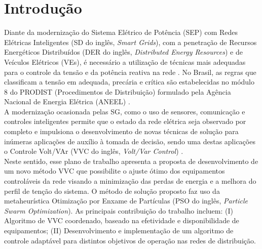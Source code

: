 \documentclass[]{IEEEphot}
\begin{document}
\section{Introdução}
Diante da modernização do Sistema Elétrico de Potência (SEP) com Redes Elétricas Inteligentes (SD do inglês, \textit{Smart Grids}), com a penetração de Recursos Energéticos Distribuídos (DER do inglês, \textit{Distributed Energy Resources}) e de Veículos Elétricos (VEs), é necessário a utilização de técnicas mais adequadas para o controle da tensão e da potência reativa na rede \cite{Agostinho2019}. No Brasil, as regras que classificam a tensão em adequada, precária e crítica são estabelecidas no módulo 8 do PRODIST (Procedimentos de Distribuição) formulado pela Agência Nacional de Energia Elétrica (ANEEL) \cite{M8Prodist}.\\
A modernização ocasionada pelas SG, como o uso de sensores, comunicação e controles inteligentes permite que o estado da rede elétrica seja observado por completo e impulsiona o desenvolvimento de novas técnicas de solução para inúmeras aplicações de auxílio à tomada de decisão, sendo uma destas aplicações o Controle Volt/VAr (VVC do inglês, \textit{Volt/Var Control}) \cite{Mello2018}.\\
Neste sentido, esse plano de trabalho apresenta a proposta de desenvolvimento de um novo método VVC que possibilite o ajuste ótimo dos equipamentos controláveis da rede visando a minimização das perdas de energia e a melhora do perfil de tenção do sistema. O método de solução proposto faz uso da metaheurística Otimização por Enxame de Partículas (PSO do inglês, \textit{Particle Swarm Optimization}). As principais contribuição do trabalho incluem: (I) Algoritmo de VVC coordenado, baseado na efetividade e disponibilidade de equipamentos; (II) Desenvolvimento e implementação de um algoritmo de controle adaptável para distintos objetivos de operação nas redes de distribuição. 
 
\end{document}
